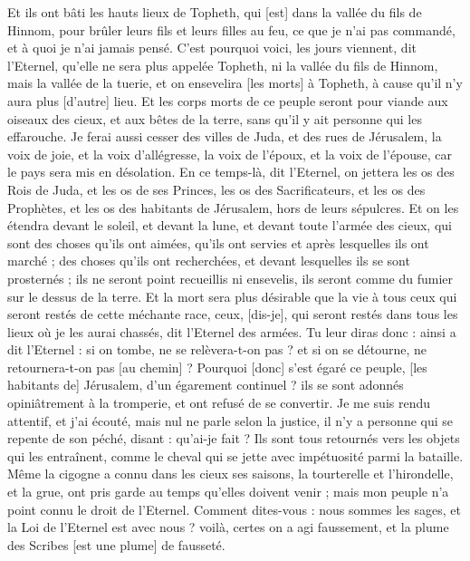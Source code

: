 \begin{multicols}{2}
Et ils ont bâti les hauts lieux de Topheth, qui [est] dans la vallée du fils de Hinnom, pour brûler leurs fils et leurs filles au feu, ce que je n'ai pas commandé, et à quoi je n'ai jamais pensé.
C'est pourquoi voici, les jours viennent, dit l'Eternel, qu'elle ne sera plus appelée Topheth, ni la vallée du fils de Hinnom, mais la vallée de la tuerie, et on ensevelira [les morts] à Topheth, à cause qu'il n'y aura plus [d'autre] lieu.
Et les corps morts de ce peuple seront pour viande aux oiseaux des cieux, et aux bêtes de la terre, sans qu'il y ait personne qui les effarouche.
Je ferai aussi cesser des villes de Juda, et des rues de Jérusalem, la voix de joie, et la voix d'allégresse, la voix de l'époux, et la voix de l'épouse, car le pays sera mis en désolation.
\VerseOne{}En ce temps-là, dit l'Eternel, on jettera les os des Rois de Juda, et les os de ses Princes, les os des Sacrificateurs, et les os des Prophètes, et les os des habitants de Jérusalem, hors de leurs sépulcres.
Et on les étendra devant le soleil, et devant la lune, et devant toute l'armée des cieux, qui sont des choses qu'ils ont aimées, qu'ils ont servies et après lesquelles ils ont marché ; des choses qu'ils ont recherchées, et devant lesquelles ils se sont prosternés ; ils ne seront point recueillis ni ensevelis, ils seront comme du fumier sur le dessus de la terre.
Et la mort sera plus désirable que la vie à tous ceux qui seront restés de cette méchante race, ceux, [dis-je], qui seront restés dans tous les lieux où je les aurai chassés, dit l'Eternel des armées.
Tu leur diras donc : ainsi a dit l'Eternel : si on tombe, ne se relèvera-t-on pas ? et si on se détourne, ne retournera-t-on pas [au chemin] ?
Pourquoi [donc] s'est égaré ce peuple, [les habitants de] Jérusalem, d'un égarement continuel ? ils se sont adonnés opiniâtrement à la tromperie, et ont refusé de se convertir.
Je me suis rendu attentif, et j'ai écouté, mais nul ne parle selon la justice, il n'y a personne qui se repente de son péché, disant : qu'ai-je fait ? Ils sont tous retournés vers les objets qui les entraînent, comme le cheval qui se jette avec impétuosité parmi la bataille.
Même la cigogne a connu dans les cieux ses saisons, la tourterelle et l'hirondelle, et la grue, ont pris garde au temps qu'elles doivent venir ; mais mon peuple n'a point connu le droit de l'Eternel.
Comment dites-vous : nous sommes les sages, et la Loi de l'Eternel est avec nous ? voilà, certes on a agi faussement, et la plume des Scribes [est une plume] de fausseté.

\end{multicols}
